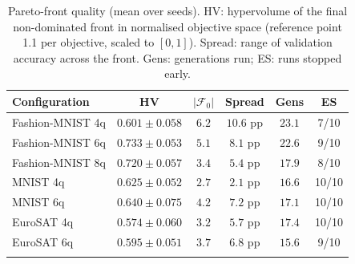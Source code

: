 \begin{table}[t]
\caption{Pareto-front quality (mean over seeds). HV: hypervolume of the final non-dominated front in normalised objective space (reference point 1.1 per objective, scaled to $[0,1]$). Spread: range of validation accuracy across the front. Gens: generations run; ES: runs stopped early.}\label{tab:pareto}
\footnotesize
\begin{tabular}{@{}lccccc@{}}
\toprule
Configuration & HV & $|\mathcal{F}_0|$ & Spread & Gens & ES \\
\midrule
Fashion-MNIST 4q & $0.601\pm0.058$ & $6.2$ & $10.6$ pp & $23.1$ & 7/10 \\
Fashion-MNIST 6q & $0.733\pm0.053$ & $5.1$ & $8.1$ pp & $22.6$ & 9/10 \\
Fashion-MNIST 8q & $0.720\pm0.057$ & $3.4$ & $5.4$ pp & $17.9$ & 8/10 \\
MNIST 4q & $0.625\pm0.052$ & $2.7$ & $2.1$ pp & $16.6$ & 10/10 \\
MNIST 6q & $0.640\pm0.075$ & $4.2$ & $7.2$ pp & $17.1$ & 10/10 \\
EuroSAT 4q & $0.574\pm0.060$ & $3.2$ & $5.7$ pp & $17.4$ & 10/10 \\
EuroSAT 6q & $0.595\pm0.051$ & $3.7$ & $6.8$ pp & $15.6$ & 9/10 \\
\botrule
\end{tabular}
\end{table}
